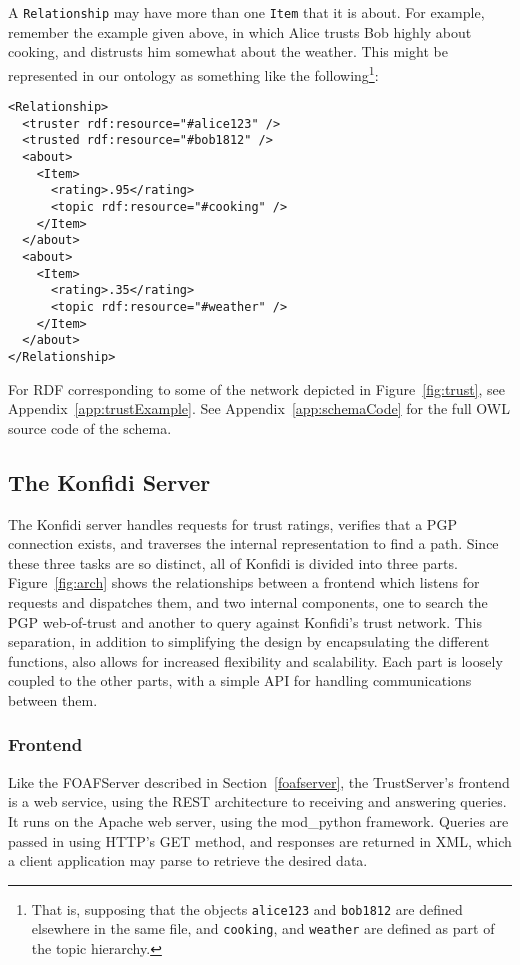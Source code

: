 \documentclass[letterpaper]{www2006-submission}
\begin{document}
A \texttt{Relationship} may have more than one \texttt{Item} that it is about.  For example, remember the example given above, in which Alice trusts Bob highly about cooking, and distrusts him somewhat about the weather.  This might be represented in our ontology as something like the following\footnote{That is, supposing that the objects \texttt{alice123} and \texttt{bob1812} are defined elsewhere in the same file, and \texttt{cooking}, and \texttt{weather} are defined as part of the topic hierarchy.}:

\begin{verbatim}
<Relationship>
  <truster rdf:resource="#alice123" />
  <trusted rdf:resource="#bob1812" />
  <about>
    <Item>
      <rating>.95</rating>
      <topic rdf:resource="#cooking" />
    </Item>
  </about>
  <about>
    <Item>
      <rating>.35</rating>
      <topic rdf:resource="#weather" />
    </Item>
  </about>
</Relationship>
\end{verbatim}

For RDF corresponding to some of the network depicted in Figure~\ref{fig:trust}, see Appendix~\ref{app:trustExample}.  See Appendix~\ref{app:schemaCode} for the full OWL source code of the schema.  

\subsection{The Konfidi Server}
The Konfidi server handles requests for trust ratings, verifies that a PGP connection exists, and traverses the internal representation to find a path.  Since these three tasks are so distinct, all of Konfidi is divided into three parts.  Figure~\ref{fig:arch} shows the relationships between a frontend which listens for requests and dispatches them, and two internal components, one to search the PGP web-of-trust and another to query against Konfidi's trust network.  This separation, in addition to simplifying the design by encapsulating the different functions, also allows for increased flexibility and scalability.  Each part is loosely coupled to the other parts, with a simple API for handling communications between them.

\subsubsection{Frontend}
Like the FOAFServer described in Section~\ref{foafserver}, the TrustServer's frontend is a web service, using the REST architecture to receiving and answering queries. 
It runs on the Apache web server, using the mod\_python framework.  Queries are passed in using HTTP's GET method, and responses are returned in XML, which a client application may parse to retrieve the desired data.
\end{document}
